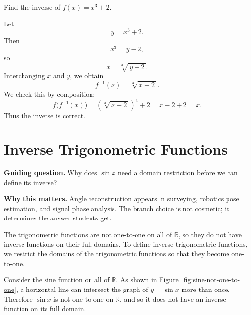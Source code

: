 \begin{example}
Find the inverse of
\(
f(x)=x^3+2.
\)
\end{example}

\begin{solution}
Let
\[
y=x^3+2.
\]
Then
\[
x^3=y-2,
\]
so
\[
x=\sqrt[3]{\,y-2\,}.
\]
Interchanging \(x\) and \(y\), we obtain
\[
f^{-1}(x)=\sqrt[3]{\,x-2\,}.
\]
We check this by composition:
\[
f\bigl(f^{-1}(x)\bigr)
=
\left(\sqrt[3]{\,x-2\,}\right)^3+2
=
x-2+2
=
x.
\]
Thus the inverse is correct.
\end{solution}


\section{Inverse Trigonometric Functions}

\begin{remark}
\textbf{Guiding question.} Why does \(\sin x\) need a domain restriction before we can define its inverse?

\textbf{Why this matters.} Angle reconstruction appears in surveying, robotics pose estimation, and signal phase analysis. The branch choice is not cosmetic; it determines the answer students get.
\end{remark}

The trigonometric functions are not one-to-one on all of \(\mathbb{R}\), so they do not have inverse functions on their full domains. To define inverse trigonometric functions, we restrict the domains of the trigonometric functions so that they become one-to-one.

Consider the sine function on all of \(\mathbb{R}\). As shown in Figure~\ref{fig:sine-not-one-to-one}, a horizontal line can intersect the graph of \(y=\sin x\) more than once. Therefore \(\sin x\) is not one-to-one on \(\mathbb{R}\), and so it does not have an inverse function on its full domain.

